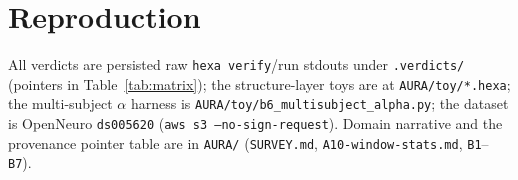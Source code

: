 \documentclass[11pt,a4paper]{article}
\begin{document}
\appendix
\section{Reproduction}\label{app:repro}
All verdicts are persisted raw \texttt{hexa verify}/run stdouts under
\texttt{.verdicts/} (pointers in Table~\ref{tab:matrix}); the structure-layer
toys are at \texttt{AURA/toy/*.hexa}; the multi-subject $\alpha$ harness is
\texttt{AURA/toy/b6\_multisubject\_alpha.py}; the dataset is OpenNeuro
\texttt{ds005620} (\texttt{aws s3 --no-sign-request}). Domain narrative and the
provenance pointer table are in \texttt{AURA/} (\texttt{SURVEY.md},
\texttt{A10-window-stats.md}, \texttt{B1}--\texttt{B7}).



\end{document}
